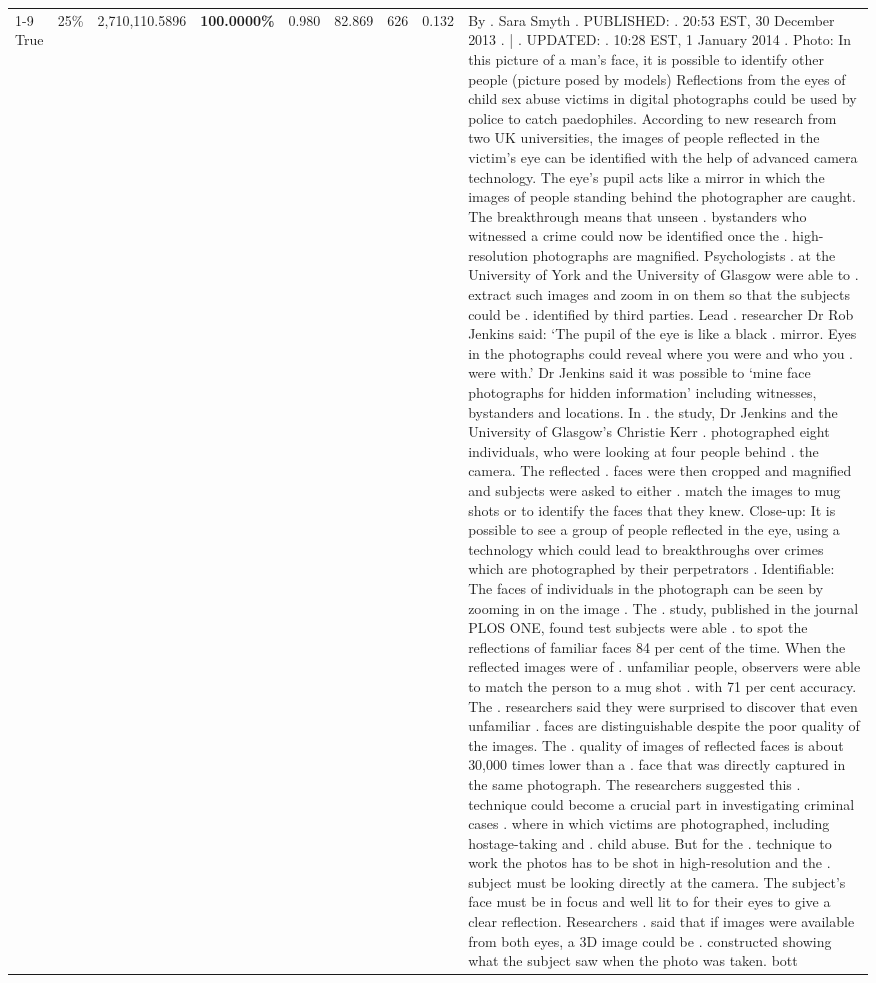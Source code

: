 \begin{table}[H]
\begin{tabular}{lllrlllll}
\cline{1-9} \cline{2-9}
True & 25\% & 2,710,110.5896 & \bfseries \color{red} 100.0000\% & 0.980 & 82.869 & 626 & 0.132 & By . Sara Smyth . PUBLISHED: . 20:53 EST, 30 December 2013 . | . UPDATED: . 10:28 EST, 1 January 2014 . Photo: In this picture of a man's face, it is possible to identify other people (picture posed by models) Reflections from the eyes of child sex abuse victims in digital photographs could be used by police to catch paedophiles. According to new research from two UK universities, the images of people reflected in the victim's eye can be identified with the help of advanced camera technology. The eye's pupil acts like a mirror in which the images of people standing behind the photographer are caught. The breakthrough means that unseen . bystanders who witnessed a crime could now be identified once the . high-resolution photographs are magnified. Psychologists . at the University of York and the University of Glasgow were able to . extract such images and zoom in on them so that the subjects could be . identified by third parties. Lead . researcher Dr Rob Jenkins said: ‘The pupil of the eye is like a black . mirror. Eyes in the photographs could reveal where you were and who you . were with.' Dr Jenkins said it was possible to ‘mine face photographs for hidden information' including witnesses, bystanders and locations. In . the study, Dr Jenkins and the University of Glasgow's Christie Kerr . photographed eight individuals, who were looking at four people behind . the camera. The reflected . faces were then cropped and magnified and subjects were asked to either . match the images to mug shots or to identify the faces that they knew. Close-up: It is possible to see a group of people reflected in the eye, using a technology which could lead to breakthroughs over crimes which are photographed by their perpetrators . Identifiable: The faces of individuals in the photograph can be seen by zooming in on the image . The . study, published in the journal PLOS ONE, found test subjects were able . to spot the reflections of familiar faces 84 per cent of the time. When the reflected images were of . unfamiliar people, observers were able to match the person to a mug shot . with 71 per cent accuracy. The . researchers said they were surprised to discover that even unfamiliar . faces are distinguishable despite the poor quality of the images. The . quality of images of reflected faces is about 30,000 times lower than a . face that was directly captured in the same photograph. The researchers suggested this . technique could become a crucial part in investigating criminal cases . where in which victims are photographed, including hostage-taking and . child abuse. But for the . technique to work the photos has to be shot in high-resolution and the . subject must be looking directly at the camera. The subject's face must be in focus and well lit to for their eyes to give a clear reflection. Researchers . said that if images were available from both eyes, a 3D image could be . constructed showing what the subject saw when the photo was taken. bott \\

\end{tabular}
\end{table}
